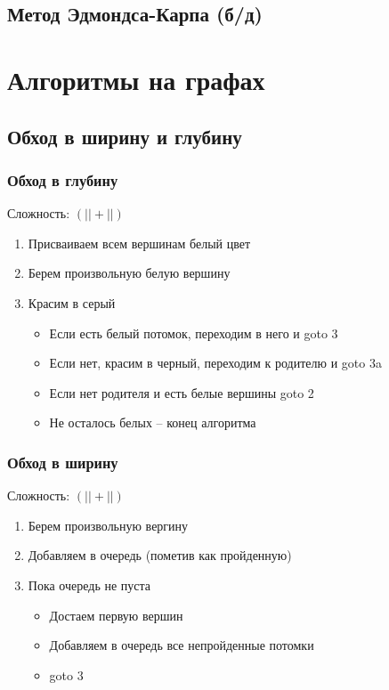\documentclass[a4paper]{article}
\begin{document}
\subsection{Метод Эдмондса-Карпа (б/д)}

\section{Алгоритмы на графах}
\subsection{Обход в ширину и глубину}
\subsubsection{Обход в глубину}
Сложность: $(|| + ||)$
\begin{enumerate}
	\item Присваиваем всем вершинам белый цвет
	\item Берем произвольную белую вершину
	\item Красим в серый
	\begin{itemize}
		\item Если есть белый потомок, переходим в него и goto 3
		\item Если нет, красим в черный, переходим к родителю и goto 3a
		\item Если нет родителя и есть белые вершины goto 2
		\item Не осталось белых – конец алгоритма
	\end{itemize}
\end{enumerate}

\subsubsection{Обход в ширину}
Сложность: $(|| + ||)$
\begin{enumerate}
	\item Берем произвольную вергину
	\item Добавляем в очередь (пометив как пройденную)
	\item Пока очередь не пуста
	\begin{itemize}
		\item Достаем первую вершин
		\item Добавляем в очередь все непройденные потомки
		\item goto 3
	\end{itemize}
\end{enumerate}
\end{document}
